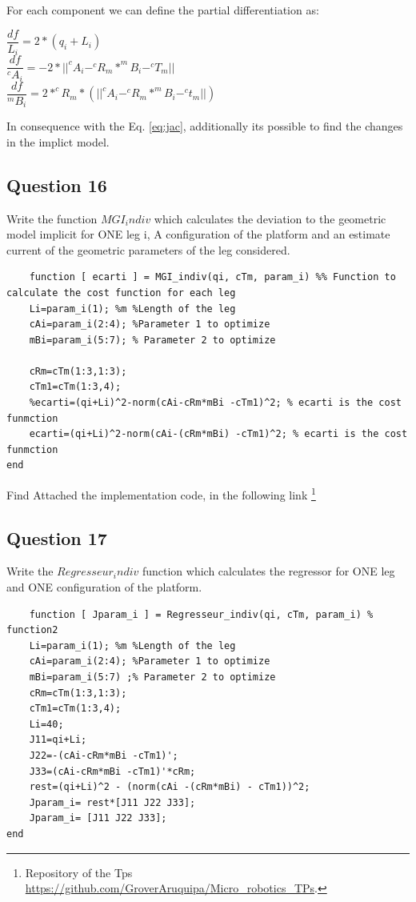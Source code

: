 \documentclass[12pt, twoside]{report}
\begin{document}
For each component we can define the partial differentiation as:\\
\begin{center}
    $\dfrac{df}{L_{i}}=2*(q_i + L_i)$\\
    $\dfrac{df}{{}^c A_{i}}= -2* ||^c A_{i} - ^c R_{m}* ^m B_{i} - ^c T_{m} || $\\
    $\dfrac{df}{{}^m B_{i}}=2* ^c R_m *(|| ^c A_{i} - ^c R_{m}* ^m B_{i} - ^c t_{m} ||)$
\end{center}

In consequence with the Eq. \ref{eq:jac}, additionally its possible to find the changes in the implict model.
\subsection{Question 16}
Write the function \textit{$MGI_indiv$} which calculates the deviation to the geometric model
implicit for ONE leg i, A configuration of the platform and an estimate current of the geometric
parameters of the leg considered.\\
\begin{lstlisting}
    function [ ecarti ] = MGI_indiv(qi, cTm, param_i) %% Function to calculate the cost function for each leg
    Li=param_i(1); %m %Length of the leg 
    cAi=param_i(2:4); %Parameter 1 to optimize 
    mBi=param_i(5:7); % Parameter 2 to optimize

    cRm=cTm(1:3,1:3);
    cTm1=cTm(1:3,4);
    %ecarti=(qi+Li)^2-norm(cAi-cRm*mBi -cTm1)^2; % ecarti is the cost funmction
    ecarti=(qi+Li)^2-norm(cAi-(cRm*mBi) -cTm1)^2; % ecarti is the cost funmction
end
\end{lstlisting}



Find Attached the implementation code, in the following link \footnote{Repository of the Tps \url{https://github.com/GroverAruquipa/Micro_robotics_TPs}.}

\subsection{Question 17}
Write the $Regresseur_indiv$ function which calculates the regressor for ONE leg and
ONE configuration of the platform.
\begin{lstlisting}
    function [ Jparam_i ] = Regresseur_indiv(qi, cTm, param_i) % function2
    Li=param_i(1); %m %Length of the leg 
    cAi=param_i(2:4); %Parameter 1 to optimize 
    mBi=param_i(5:7) ;% Parameter 2 to optimize
    cRm=cTm(1:3,1:3);
    cTm1=cTm(1:3,4);
    Li=40;
    J11=qi+Li;
    J22=-(cAi-cRm*mBi -cTm1)';
    J33=(cAi-cRm*mBi -cTm1)'*cRm;
    rest=(qi+Li)^2 - (norm(cAi -(cRm*mBi) - cTm1))^2;
    Jparam_i= rest*[J11 J22 J33];
    Jparam_i= [J11 J22 J33];
end
\end{lstlisting}
\end{document}
